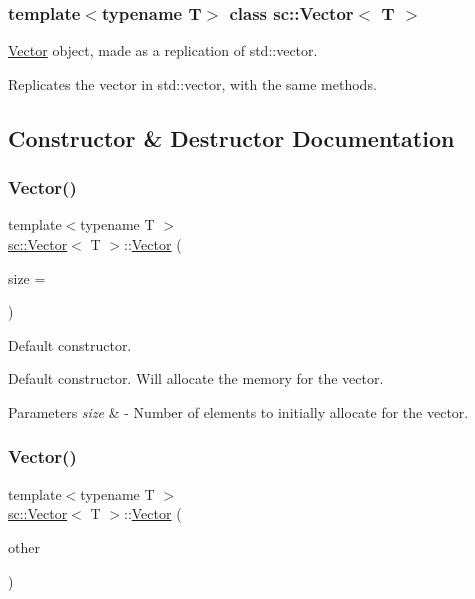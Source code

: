 \subsubsection*{template$<$typename T$>$\newline
class sc\+::\+Vector$<$ T $>$}

\hyperlink{classsc_1_1Vector}{Vector} object, made as a replication of std\+::vector. 

Replicates the vector in std\+::vector, with the same methods. 

\subsection{Constructor \& Destructor Documentation}
\mbox{\label{classsc_1_1Vector_a4832f9a5721078c4d2c89370f0fd96d0}} 
\subsubsection{\texorpdfstring{Vector()}{Vector()}\hspace{0.1cm}{\footnotesize\ttfamily [1/2]}}
{\footnotesize\ttfamily template$<$typename T $>$ \\
\hyperlink{classsc_1_1Vector}{sc\+::\+Vector}$<$ T $>$\+::\hyperlink{classsc_1_1Vector}{Vector} (\begin{DoxyParamCaption}\item[{size\+\_\+t}]{size = {} }\end{DoxyParamCaption})\hspace{0.3cm}{\ttfamily [inline]}}



Default constructor. 

Default constructor. Will allocate the memory for the vector. 
\begin{DoxyParams}{Parameters}
{\em size} & -\/ Number of elements to initially allocate for the vector. \\
\hline
\end{DoxyParams}
\mbox{\label{classsc_1_1Vector_a2b482471a80d2570089ad1cd68aae03e}} 
\subsubsection{\texorpdfstring{Vector()}{Vector()}\hspace{0.1cm}{\footnotesize\ttfamily [2/2]}}
{\footnotesize\ttfamily template$<$typename T $>$ \\
\hyperlink{classsc_1_1Vector}{sc\+::\+Vector}$<$ T $>$\+::\hyperlink{classsc_1_1Vector}{Vector} (\begin{DoxyParamCaption}\item[{\hyperlink{classsc_1_1Vector}{Vector}$<$ T $>$ \&}]{other }\end{DoxyParamCaption})\hspace{0.3cm}{\ttfamily [inline]}}



